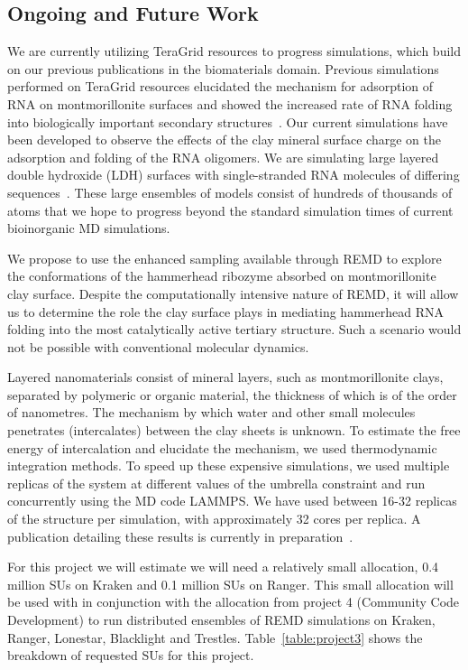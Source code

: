 \documentclass[a4paper,10pt]{article}
\begin{document}
\subsection{Ongoing and Future Work}
We are currently utilizing TeraGrid resources to progress simulations, which build on our previous publications in the biomaterials domain. Previous simulations performed on TeraGrid resources elucidated the mechanism for adsorption of RNA on montmorillonite surfaces and showed the increased rate of RNA folding into biologically important secondary structures~\cite{Ref9}. Our current simulations have been developed to observe the effects of the clay mineral surface charge on the adsorption and folding of the RNA oligomers. We are simulating large layered double hydroxide (LDH) surfaces with single-stranded RNA molecules of differing sequences~\cite{Ref10}. These large ensembles of models consist of hundreds of thousands of atoms that we hope to progress beyond the standard simulation times of current bioinorganic MD simulations.

We propose to use the enhanced sampling available through REMD to explore the conformations of the hammerhead ribozyme absorbed on montmorillonite clay surface. Despite the computationally intensive nature of REMD, it will allow us to determine the role the clay surface plays in mediating hammerhead RNA folding into the most catalytically active tertiary structure. Such a scenario would not be possible with conventional molecular dynamics.

Layered nanomaterials consist of mineral layers, such as montmorillonite clays, separated by polymeric or organic material, the thickness of which is of the order of nanometres. The mechanism by which water and other small molecules penetrates (intercalates) between the clay sheets is unknown. To estimate the free energy of intercalation and elucidate the mechanism, we used thermodynamic integration methods. To speed up these expensive simulations, we used multiple replicas of the system at different values of the umbrella constraint and run concurrently using the MD code LAMMPS. We have used between 16-32 replicas of the structure per simulation, with approximately 32 cores per replica. A publication detailing these results is currently in preparation~\cite{Ref11}.

For this project we will estimate we will need a relatively small allocation, 0.4 million SUs on Kraken and 0.1 million SUs on Ranger. This small allocation will be used with in conjunction with the allocation from project 4 (Community Code Development) to run distributed ensembles of REMD simulations on Kraken, Ranger, Lonestar, Blacklight and Trestles. Table~\ref{table:project3} shows the breakdown of requested SUs for this project.
\end{document}
